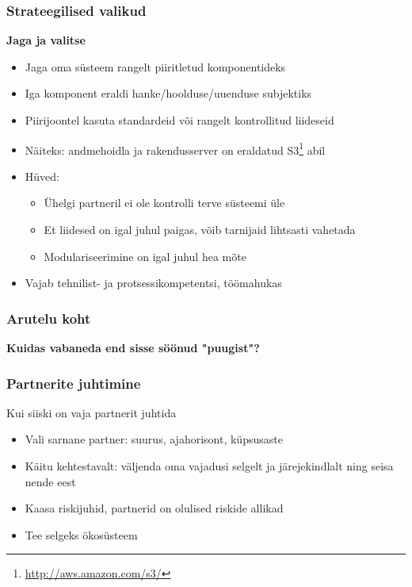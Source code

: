 \begin{frame}[fragile]
  \frametitle{Strateegilised valikud}
	\textbf{	Jaga ja valitse}
	\begin{itemize}
		\item Jaga oma süsteem rangelt piiritletud komponentideks 
		\item Iga komponent eraldi hanke/hoolduse/uuenduse subjektiks
		\item Piirijoontel kasuta standardeid või rangelt kontrollitud liideseid
		\item Näiteks: andmehoidla ja rakendusserver on eraldatud S3\footnote{\url{http://aws.amazon.com/s3/}} abil
		\item Hüved:
		\begin{itemize}
			\item Ühelgi partneril ei ole kontrolli terve süsteemi üle
			\item Et liidesed on igal juhul paigas, võib tarnijaid lihtsasti vahetada
			\item Modulariseerimine on igal juhul hea mõte
		\end{itemize}
		\item Vajab tehnilist- ja protsessikompetentsi, töömahukas
	\end{itemize}
\end{frame}


\begin{frame}[fragile]
  \frametitle{Arutelu koht}
		\begin{center}
			\textbf{Kuidas vabaneda end sisse söönud "puugist"?}
		\end{center}
\end{frame}

\begin{frame}[fragile]
  \frametitle{Partnerite juhtimine}
  Kui siiski on vaja partnerit juhtida
	\begin{itemize}
		\item Vali sarnane partner: suurus, ajahorisont, küpsusaste
		\item Käitu kehtestavalt: väljenda oma vajadusi selgelt ja järejekindlalt ning seisa nende eest
		\item Kaasa riskijuhid, partnerid on olulised riskide allikad
		\item Tee selgeks ökosüsteem
	\end{itemize}
\end{frame}

